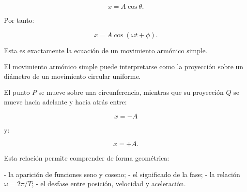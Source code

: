 \[ x=A\cos\theta. \]

Por tanto:

\[ x=A\cos(\omega t+\phi). \]

Esta es exactamente la ecuación de un movimiento armónico simple.

\begin{center}
\end{center}

\begin{interpretacion}
El movimiento armónico simple puede interpretarse como la proyección sobre un diámetro de un movimiento circular uniforme.

El punto \(P\) se mueve sobre una circunferencia, mientras que su proyección \(Q\) se mueve hacia adelante y hacia atrás entre:

\[ x=-A \]

y:

\[ x=+A. \]
\end{interpretacion}

Esta relación permite comprender de forma geométrica:

- la aparición de funciones seno y coseno;
- el significado de la fase;
- la relación \(\omega=2\pi/T\);
- el desfase entre posición, velocidad y aceleración.

